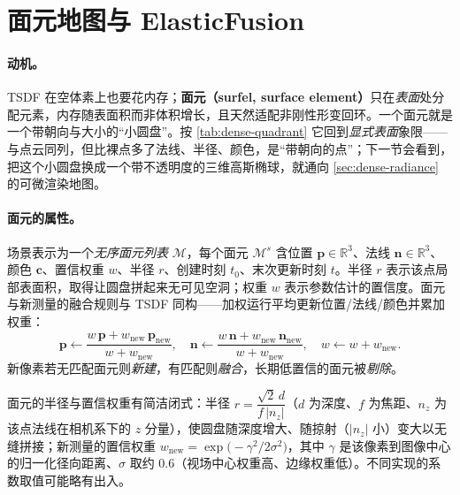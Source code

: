 \section{面元地图与 ElasticFusion}
\label{sec:dense-surfel}

\paragraph{动机。}
TSDF 在空体素上也要花内存；\textbf{面元（surfel, surface element）}只在\emph{表面}处分配元素，内存随表面积而非体积增长，且天然适配非刚性形变回环\cite{whelan2015elasticfusion}。一个面元就是一个带朝向与大小的“小圆盘”。按 \cref{tab:dense-quadrant} 它回到\emph{显式表面}象限——与点云同列，但比裸点多了法线、半径、颜色，是“带朝向的点”；下一节会看到，把这个小圆盘换成一个带不透明度的三维高斯椭球，就通向 \cref{sec:dense-radiance} 的可微渲染地图。

\paragraph{面元的属性。}
场景表示为一个\emph{无序面元列表} $\mathcal{M}$，每个面元 $\mathcal{M}^s$ 含位置 $\mathbf{p}\in\mathbb{R}^3$、法线 $\mathbf{n}\in\mathbb{R}^3$、颜色 $\mathbf{c}$、置信权重 $w$、半径 $r$、创建时刻 $t_0$、末次更新时刻 $t$\cite{whelan2015elasticfusion}。半径 $r$ 表示该点局部表面积，取得让圆盘拼起来无可见空洞；权重 $w$ 表示参数估计的置信度。面元与新测量的融合规则与 TSDF 同构——加权运行平均更新位置/法线/颜色并累加权重\cite{keller2013pointfusion}：
\begin{equation}
  \mathbf{p}\leftarrow\frac{w\,\mathbf{p}+w_{\mathrm{new}}\,\mathbf{p}_{\mathrm{new}}}{w+w_{\mathrm{new}}},\quad
  \mathbf{n}\leftarrow\frac{w\,\mathbf{n}+w_{\mathrm{new}}\,\mathbf{n}_{\mathrm{new}}}{w+w_{\mathrm{new}}},\quad
  w\leftarrow w+w_{\mathrm{new}}.
  \label{eq:dense-surfel-fuse}
\end{equation}
新像素若无匹配面元则\emph{新建}，有匹配则\emph{融合}，长期低置信的面元被\emph{剔除}。

\begin{note}
面元的半径与置信权重有简洁闭式\cite{keller2013pointfusion}：半径 $r=\dfrac{\sqrt{2}\,d}{f\,|n_z|}$（$d$ 为深度、$f$ 为焦距、$n_z$ 为该点法线在相机系下的 $z$ 分量），使圆盘随深度增大、随掠射（$|n_z|$ 小）变大以无缝拼接；新测量的置信权重 $w_{\mathrm{new}}=\exp\!\bigl(-\gamma^2/2\sigma^2\bigr)$，其中 $\gamma$ 是该像素到图像中心的归一化径向距离、$\sigma$ 取约 $0.6$（视场中心权重高、边缘权重低）。不同实现的系数取值可能略有出入。
\end{note}

